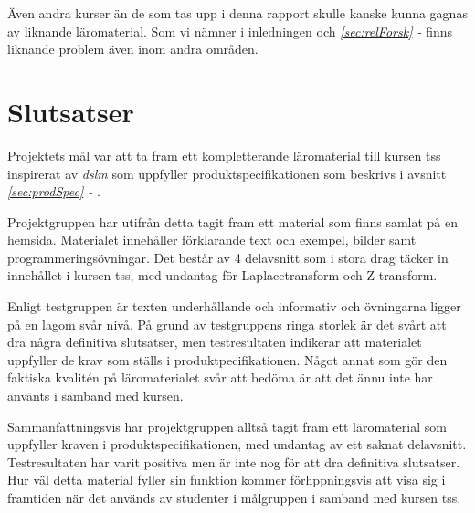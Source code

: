 \documentclass[12pt,a4paper,twoside,openright]{article}
\begin{document}
Även andra kurser än de som tas upp i denna rapport skulle kanske
kunna gagnas av liknande läromaterial. Som vi nämner i inledningen och
\textit{\ref{sec:relForsk} - } finns liknande
problem även inom andra områden.

\newpage

\section{Slutsatser}

Projektets mål var att ta fram ett kompletterande läromaterial till
kursen \gls{tss} inspirerat av \textit{\gls{dslm}} som uppfyller
produktspecifikationen som beskrivs i avsnitt
\textit{\ref{sec:prodSpec} - }.

Projektgruppen har utifrån detta tagit fram ett material som finns
samlat på en hemsida. Materialet innehåller förklarande text och
exempel, bilder samt programmeringsövningar. Det består av 4
delavsnitt som i stora drag täcker in innehållet i kursen
\gls{tss}, med undantag för Laplacetransform och Z-transform.

Enligt testgruppen är texten underhållande och informativ och
övningarna ligger på en lagom svår nivå. På grund av testgruppens
ringa storlek är det svårt att dra några definitiva slutsatser, men
testresultaten indikerar att materialet uppfyller de krav som ställs i
produktpecifikationen. Något annat som gör den faktiska kvalitén på
läromaterialet svår att bedöma är att det ännu inte har använts i
samband med kursen.

Sammanfattningsvis har projektgruppen alltså tagit fram ett
läromaterial som uppfyller kraven i produktspecifikationen, med
undantag av ett saknat delavsnitt. Testresultaten har varit positiva
men är inte nog för att dra definitiva slutsatser. Hur väl detta
material fyller sin funktion kommer förhppningsvis att visa sig i
framtiden när det används av studenter i målgruppen i samband med
kursen \gls{tss}.

\newpage




\newpage

\appendix
\end{document}
